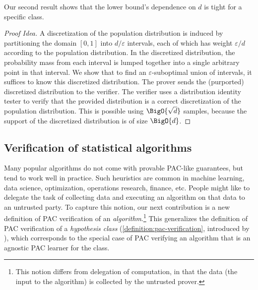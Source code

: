 \documentclass{toc}
\begin{document}
Our second result shows that the lower bound's dependence on $d$ is tight for a specific class.


\begin{proof}[Proof Idea]
	A discretization of the population distribution is induced by partitioning the domain $[0,1]$ into $d/\varepsilon$ intervals, each of which has weight $\varepsilon/d$ according to the population distribution. In the discretized distribution, the probability mass from each interval is lumped together into a single arbitrary point in that interval. We show that to find an $\varepsilon$-suboptimal union of intervals, it suffices to know this discretized distribution. The prover sends the (purported) discretized distribution to the verifier. The verifier uses a distribution identity tester to verify that the provided distribution is a correct discretization of the population distribution. This is possible using $\BigO{\sqrt{d}}$ samples, because the support of the discretized distribution is of size $\BigO{d}$.
\end{proof} 

\subsection{Verification of statistical algorithms}\label{section:verification-of-statistical-algorithm}

Many popular algorithms do not come with provable PAC-like guarantees, but tend to work well in practice. Such heuristics are common in machine learning, data science, optimization, operations research, finance, etc. People might like to delegate the task of collecting data and executing an algorithm on that data to an untrusted party.
To capture this notion, our next contribution is a new definition of PAC verification of an \emph{algorithm}.\footnote{This notion differs from delegation of computation, in that the data (the input to the algorithm) is collected by the untrusted prover.}
This generalizes the definition of PAC verification of a \emph{hypothesis class} (\cref{definition:pac-verification}, introduced by \cite{GoldwasserRSY21}), which corresponds to the special case of PAC verifying an algorithm that is an agnostic PAC learner for the class.
\end{document}
